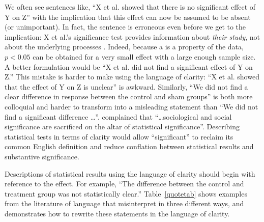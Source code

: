 We often see sentences like, ``X et al. showed that there is no significant effect of Y on Z'' with the implication that this effect can now be assumed to be absent (or unimportant). In fact, the sentence is erroneous even before we get to the implication: X et al.'s significance test provides information about \emph{their study}, not about the underlying processes \citep{HoenigandHeisey2001}. Indeed, because a \pval is a property of the data, $p < 0.05$ can be obtained for a very small effect with a large enough sample size. A better formulation would be ``X et al. did not find a significant effect of Y on Z.'' This mistake is harder to make using the language of clarity:  ``X et al. showed that the effect of Y on Z is unclear'' is awkward. Similarly, ``We did not find a clear difference in response between the control and sham groups'' is both more colloquial and harder to transform into a misleading statement than ``We did not find a significant difference \ldots''. \citet{Bernardietal.2017} complained that ``\ldots sociological and social significance are sacrificed on the altar of statistical significance''. Describing statistical tests in terms of clarity would allow ``significant'' to reclaim its common English definition and reduce conflation between statistical results and substantive significance.

Descriptions of statistical results using the language of clarity should begin with reference to the effect. For example, ``The difference between the control and treatment group was not statistically clear.'' Table~\ref{quotetab} shows examples from the literature of language that misinterpret \pvals in three different ways, and demonstrates how to rewrite these statements in the language of clarity.

